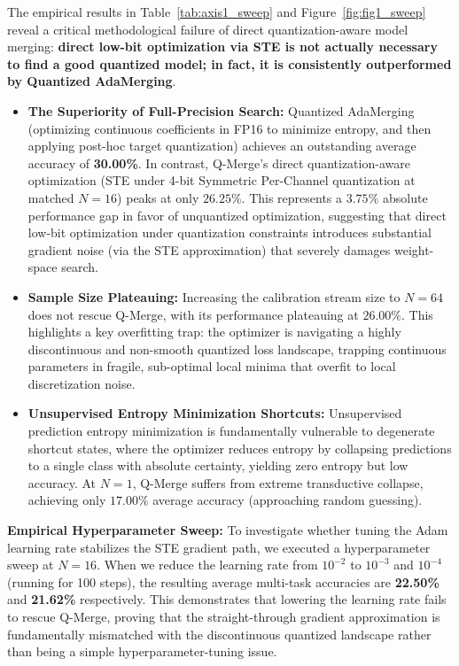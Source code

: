 The empirical results in Table~\ref{tab:axis1_sweep} and Figure~\ref{fig:fig1_sweep} reveal a critical methodological failure of direct quantization-aware model merging: \textbf{direct low-bit optimization via STE is not actually necessary to find a good quantized model; in fact, it is consistently outperformed by Quantized AdaMerging}.
\begin{itemize}
    \item \textbf{The Superiority of Full-Precision Search:} Quantized AdaMerging (optimizing continuous coefficients in FP16 to minimize entropy, and then applying post-hoc target quantization) achieves an outstanding average accuracy of \textbf{30.00\%}. In contrast, Q-Merge's direct quantization-aware optimization (STE under 4-bit Symmetric Per-Channel quantization at matched $N=16$) peaks at only $26.25\%$. This represents a $3.75\%$ absolute performance gap in favor of unquantized optimization, suggesting that direct low-bit optimization under quantization constraints introduces substantial gradient noise (via the STE approximation) that severely damages weight-space search.
    \item \textbf{Sample Size Plateauing:} Increasing the calibration stream size to $N=64$ does not rescue Q-Merge, with its performance plateauing at $26.00\%$. This highlights a key overfitting trap: the optimizer is navigating a highly discontinuous and non-smooth quantized loss landscape, trapping continuous parameters in fragile, sub-optimal local minima that overfit to local discretization noise.
    \item \textbf{Unsupervised Entropy Minimization Shortcuts:} Unsupervised prediction entropy minimization is fundamentally vulnerable to degenerate shortcut states, where the optimizer reduces entropy by collapsing predictions to a single class with absolute certainty, yielding zero entropy but low accuracy. At $N=1$, Q-Merge suffers from extreme transductive collapse, achieving only $17.00\%$ average accuracy (approaching random guessing).
\end{itemize}

\textbf{Empirical Hyperparameter Sweep:} To investigate whether tuning the Adam learning rate stabilizes the STE gradient path, we executed a hyperparameter sweep at $N=16$. When we reduce the learning rate from $10^{-2}$ to $10^{-3}$ and $10^{-4}$ (running for 100 steps), the resulting average multi-task accuracies are \textbf{22.50\%} and \textbf{21.62\%} respectively. This demonstrates that lowering the learning rate fails to rescue Q-Merge, proving that the straight-through gradient approximation is fundamentally mismatched with the discontinuous quantized landscape rather than being a simple hyperparameter-tuning issue.

